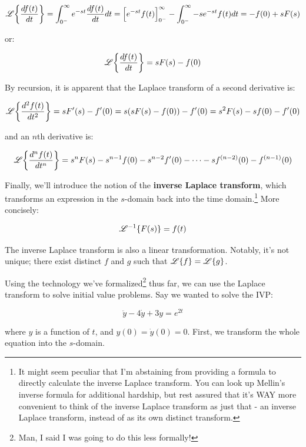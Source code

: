 \documentclass{report}
\begin{document}
\begin{onehalfspacing}
\begin{flushleft}
\vspace{-0.1in}
\[\mathscr{L} \qty{\frac{df(t)}{dt}} = \int_{0^-} ^\infty e^{-st} \frac{df(t)}{dt} dt = \qty\Big[ e^{-st} f(t) ]_{0^-}^{\infty} - \int_{0^-} ^\infty -s e^{-st} f(t) dt = -f(0) + sF(s)\]

or:

\vspace{-0.1in}
\[\mathscr{L} \qty{\frac{df(t)}{dt}} = sF(s) - f(0)\]

\vspace{-0.1in}
By recursion, it is apparent that the Laplace transform of a second derivative is:

\vspace{-0.1in}
\[\mathscr{L} \qty{\frac{d^2f(t)}{dt^2}} = sF'(s) - f'(0)= s(sF(s) - f(0)) - f'(0) = s^2 F(s) - sf(0) - f'(0)\]

and an \(n\)th derivative is:

\vspace{-0.1in}
\[\mathscr{L} \qty{\frac{d^n f(t)}{dt^n}} = s^n F(s) - s^{n-1} f(0) - s^{n-2} f'(0) - \dots - s f^{(n-2)}(0) - f^{(n-1)} (0)\]

Finally, we'll introduce the notion of the \textbf{inverse Laplace transform}, which transforms an expression in the \(s\)-domain back into the time domain.\footnote{It might seem peculiar that I'm abstaining from providing a formula to directly calculate the inverse Laplace transform. You can look up Mellin's inverse formula for additional hardship, but rest assured that it's WAY more convenient to think of the inverse Laplace transform as just that - an inverse Laplace transform, instead of as its own distinct transform.} More concisely:

\vspace{-0.1in}
\[\mathscr{L}^{-1} \qty{F(s)} = f(t)\]

The inverse Laplace transform is also a linear transformation. Notably, it's not unique; there exist distinct \(f\) and \(g\) such that \(\mathscr{L} \qty{f} = \mathscr{L} \qty{g}\).

\medskip

Using the technology we've formalized\footnote{Man, I said I was going to do this less formally!} thus far, we can use the Laplace transform to solve initial value problems. Say we wanted to solve the IVP:

\vspace{-0.1in}
\[\ddot{y} - 4\dot{y} + 3 y = e^{2t}\]

where \(y\) is a function of \(t\), and \(y(0) = \dot{y}(0) = 0\). First, we transform the whole equation into the \(s\)-domain.


\end{flushleft}
\end{onehalfspacing}
\end{document}
